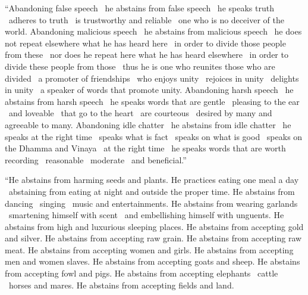 \begin{justify}
“Abandoning false speech \breathmark\ he abstains from false speech \breathmark\ he speaks truth \breathmark\ adheres to truth \breathmark\ is trustworthy and reliable \breathmark\ one who is no deceiver of the world. Abandoning malicious speech \breathmark\ he abstains from malicious speech \breathmark\ he does not repeat elsewhere what he has heard here \breathmark\ in order to divide those people
from these \breathmark\ nor does he repeat here what he has heard elsewhere \breathmark\ in order to divide these people from those \breathmark\ thus he is one who reunites those who are divided \breathmark\ a promoter of friendships \breathmark\ who enjoys unity \breathmark\ rejoices in unity \breathmark\ delights in unity \breathmark\ a speaker of words that promote unity. Abandoning harsh speech \breathmark\ he abstains from harsh speech \breathmark\ he speaks words that are gentle \breathmark\ pleasing to the ear \breathmark\ and loveable \breathmark\ that go to the heart \breathmark\ are courteous \breathmark\ desired by many and agreeable to many. Abandoning idle chatter \breathmark\ he abstains from idle chatter \breathmark\ he speaks at the right time \breathmark\ speaks what is fact \breathmark\ speaks on what is good \breathmark\ speaks on the Dhamma and Vinaya \breathmark\ at the right time \breathmark\ he speaks words that are worth recording \breathmark\ reasonable \breathmark\ moderate \breathmark\ and beneficial.”
\end{justify}

\begin{justify}
“He abstains from harming seeds and plants. He practices eating one meal a day \breathmark\ abstaining from eating at night and outside the proper time. He abstains from dancing \breathmark\ singing \breathmark\ music and entertainments. He abstains from wearing garlands \breathmark\ smartening himself with scent \breathmark\ and embellishing himself with unguents. He abstains from high and luxurious sleeping places. He abstains from accepting gold and silver. He abstains from accepting raw grain. He abstains from accepting raw meat. He abstains from accepting women and girls. He abstains from accepting men and women slaves. He abstains from accepting goats and sheep. He abstains from accepting fowl and pigs. He abstains from accepting elephants \breathmark\ cattle \breathmark\ horses and mares. He abstains from accepting fields and land.
\end{justify}

